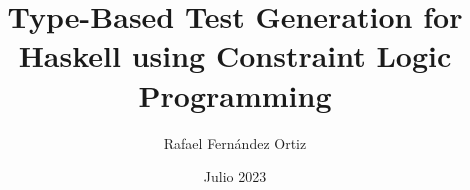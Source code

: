 \newcommand{\Estudios}{Master}

\newcommand{\TituloEstudios}{Formal Methods for Computer Science and Engineering}

\newcommand{\Departamento}{Departamento de Lenguajes y Sistemas Informáticos e Ingeniería de Software}

\newcommand{\NombreAutor}{Rafael Fernández Ortiz}

\newcommand{\NombreTutor}{Julio Mariño Carballo}

\newcommand{\TituloTFM}{Type-Based Test Generation for Haskell using Constraint Logic Programming}

\newcommand{\Fecha}{Julio 2023}

\title{\TituloTFM}
\author{\NombreAutor}
\date{\Fecha}
